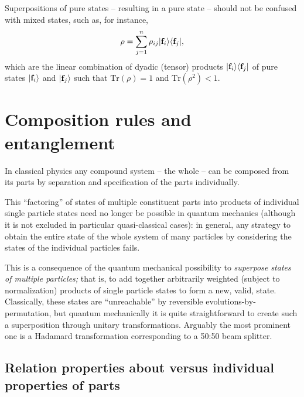 Superpositions of pure states -- resulting in a pure state -- should not be confused with mixed states, such as, for instance,
\begin{equation}
\rho = \sum_{j=1}^n  \rho_{ij} \vert {\bf f}_i \rangle  \langle   {\bf f}_j    \vert
,
\end{equation}
which are the linear combination of dyadic (tensor) products $\vert {\bf f}_i \rangle  \langle   {\bf f}_j    \vert$ of pure states $\vert {\bf f}_i \rangle  $
and  $\vert {\bf f}_j \rangle  $
such that  $\textrm{Tr}(\rho  )= 1$ and  $\textrm{Tr}(\rho^2  )< 1$.


\section{Composition rules and entanglement}
\label{2016-pu-book-chapter-qm-cre}

In classical physics any compound system -- the whole -- can be composed from its parts by separation and specification of the parts individually.

This ``factoring'' of states of multiple constituent parts into products of individual single particle states need no longer be possible in quantum mechanics
(although it is not excluded in particular quasi-classical cases): in general,
any strategy to obtain the entire state of the whole system of many particles by considering the states of the individual particles fails.

This is a consequence of the quantum mechanical possibility to {\em superpose states of multiple particles;}
that is, to add together arbitrarily weighted (subject to normalization) products of single particle states to form a new, valid, state.
Classically, these states are ``unreachable'' by reversible evolutions-by-permutation, but quantum mechanically it is quite
straightforward to create such a superposition through unitary transformations.
Arguably the most prominent one is a Hadamard transformation corresponding to a 50:50 beam splitter.

\subsection{Relation properties about versus individual properties of parts}

